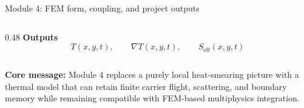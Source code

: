 \documentclass[aspectratio=169,9pt]{beamer}
\begin{document}
\begin{frame}{Module 4: FEM form, coupling, and project outputs}
\begin{columns}[T,totalwidth=\textwidth]
\begin{column}{0.48\textwidth}
\textbf{Outputs}
\begin{equation*}
\boxed{T(x,y,t)},\qquad
\boxed{\nabla T(x,y,t)},\qquad
\boxed{S_{\mathrm{eff}}(x,y,t)}
\end{equation*}
\end{column}
\end{columns}

\vspace{1mm}
\begin{orangebox}
\centering\scriptsize
\textbf{Core message:} Module 4 replaces a purely local heat-smearing picture with a thermal model that can retain finite carrier flight, scattering, and boundary memory while remaining compatible with FEM-based multiphysics integration.
\end{orangebox}
\end{frame}
\end{document}
